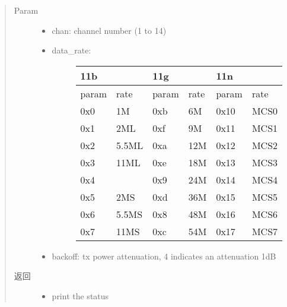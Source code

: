 \documentclass[letterpaper,10pt,english]{sphinxhowto}
\begin{document}
\begin{fulllineitems}
\begin{fulllineitems}
\begin{quote}
\begin{description}
\item[{Param}] \leavevmode\begin{itemize}
\item {} 
chan: channel number (1 to 14)

\item {} \begin{description}
\item[{data\_rate:}] \leavevmode

\begin{savenotes}\sphinxattablestart
\centering
\begin{tabulary}{\linewidth}[t]{|T|T|T|T|T|T|}
\hline
\sphinxstyletheadfamily 
11b
&\sphinxstyletheadfamily &\sphinxstyletheadfamily 
11g
&\sphinxstyletheadfamily &\sphinxstyletheadfamily 
11n
&\sphinxstyletheadfamily \\
\hline\sphinxstyletheadfamily 
param
&\sphinxstyletheadfamily 
rate
&\sphinxstyletheadfamily 
param
&\sphinxstyletheadfamily 
rate
&\sphinxstyletheadfamily 
param
&\sphinxstyletheadfamily 
rate
\\
\hline
0x0
&
1M
&
0xb
&
6M
&
0x10
&
MCS0
\\
\hline
0x1
&
2ML
&
0xf
&
9M
&
0x11
&
MCS1
\\
\hline
0x2
&
5.5ML
&
0xa
&
12M
&
0x12
&
MCS2
\\
\hline
0x3
&
11ML
&
0xe
&
18M
&
0x13
&
MCS3
\\
\hline
0x4
&
\textendash{}
&
0x9
&
24M
&
0x14
&
MCS4
\\
\hline
0x5
&
2MS
&
0xd
&
36M
&
0x15
&
MCS5
\\
\hline
0x6
&
5.5MS
&
0x8
&
48M
&
0x16
&
MCS6
\\
\hline
0x7
&
11MS
&
0xc
&
54M
&
0x17
&
MCS7
\\
\hline
\end{tabulary}
\par
\sphinxattableend\end{savenotes}

\end{description}

\item {} 
backoff: tx power attenuation, 4 indicates an attenuation 1dB

\end{itemize}

\item[{返回}] \leavevmode
\begin{itemize}
\item {} 
print the status

\end{itemize}


\end{description}\end{quote}

\end{fulllineitems}


\end{fulllineitems}
\end{document}
